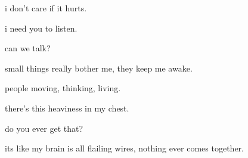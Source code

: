 \documentclass[extrafontsizes, 48pt]{memoir}
\newcommand\blankpage{%
    \null
    \thispagestyle{empty}%
    \addtocounter{page}{-1}%
    \newpage}
\begin{document}
	\begin{minipage}{.6\textwidth}
	i don't care if it hurts.
	\end{minipage}
	\newpage

	\begin{minipage}{.6\textwidth}
	i need you to listen.
	\afterpage{\blankpage}
	\end{minipage}
	\newpage

	\begin{minipage}{.6\textwidth}
	can we talk?
	\afterpage{\blankpage}
	\end{minipage}
	\newpage

	\begin{minipage}{.6\textwidth}
	small things really bother me, they keep me awake.
	\end{minipage}
	\newpage

	\begin{minipage}{.6\textwidth}
	people moving, thinking, living.
	\afterpage{\blankpage}
	\end{minipage}
	\newpage

	\begin{minipage}{.6\textwidth}
	there's this heaviness in my chest.
	\end{minipage}
	\newpage

	\begin{minipage}{.6\textwidth}
	do you ever get that?
	\end{minipage}
	\newpage

	\begin{minipage}{.6\textwidth}
	its like my brain is all flailing wires, nothing ever comes together.
	\end{minipage}
	\newpage
\end{document}
